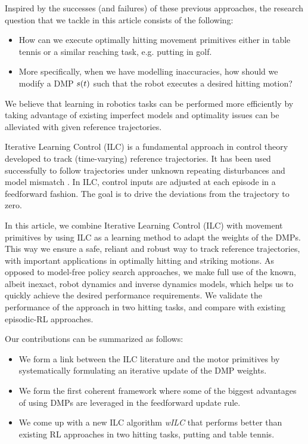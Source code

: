 Inspired by the successes (and failures) of these previous approaches, the research question that we tackle in this article consists of the following:

\begin{itemize}
\item How can we execute optimally hitting movement primitives either in table tennis or a similar reaching task, e.g. putting in golf.

\item More specifically, when we have modelling inaccuracies, how should we modify a DMP $s(t)$ such that the robot executes a desired hitting motion?
\end{itemize}

We believe that learning in robotics tasks can be performed more efficiently by taking advantage of existing imperfect models and optimality issues can be alleviated with given reference trajectories. 

Iterative Learning Control (ILC) is a fundamental approach in control theory developed to track (time-varying) reference trajectories. It has been used successfully to follow trajectories under unknown repeating disturbances and model mismatch \cite{Bristow06}. In ILC, control inputs are adjusted at each episode in a feedforward fashion. The goal is to drive the deviations from the trajectory to zero. 

In this article, we combine Iterative Learning Control (ILC) with movement primitives by using ILC as a learning method to adapt the weights of the DMPs. This way we ensure a safe, reliant and robust way to track reference trajectories, with important applications in optimally hitting and striking motions. As opposed to model-free policy search approaches, we make full use of the known, albeit inexact, robot dynamics and inverse dynamics models, which helps us to quickly achieve the desired performance requirements. We validate the performance of the approach in two hitting tasks, and compare with existing episodic-RL approaches.

Our contributions can be summarized as follows:

\begin{itemize}
\item We form a link between the ILC literature and the motor primitives by systematically formulating an iterative update of the DMP weights.

\item We form the first coherent framework where some of the biggest advantages of using DMPs are leveraged in the feedforward update rule.

\item We come up with a new ILC algorithm \emph{wILC} that performs better than existing RL approaches in two hitting tasks, putting and table tennis.

\end{itemize}

